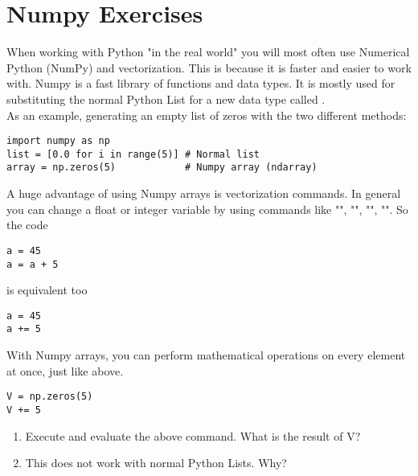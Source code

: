\documentclass{article}
\begin{document}
\newpage


\section{Numpy Exercises}




When working with Python "in the real world" you will most often use Numerical Python (NumPy) and vectorization.
This is because it is faster and easier to work with.
Numpy is a fast library of functions and data types.
It is mostly used for substituting the normal Python List for a new data type called .\\

As an example, generating an empty list of zeros with the two different methods:

\begin{lstlisting}
import numpy as np
list = [0.0 for i in range(5)] # Normal list
array = np.zeros(5)            # Numpy array (ndarray)
\end{lstlisting}

A huge advantage of using Numpy arrays is vectorization commands.
In general you can change a float or integer variable by using commands like
"\code{+=}",
"\code{-=}",
"\code{*=}",
"\code{/=}". So the code

\begin{lstlisting}
a = 45
a = a + 5
\end{lstlisting}

is equivalent too

\begin{lstlisting}
a = 45
a += 5
\end{lstlisting}

With Numpy arrays, you can perform mathematical operations on every element at once,
just like above.
\begin{lstlisting}
V = np.zeros(5)
V += 5
\end{lstlisting}

\begin{enumerate}[resume]
    \item Execute and evaluate the above command.
        What is the result of V?
    \item This does not work with normal Python Lists. Why? 
\end{enumerate}
\end{document}
